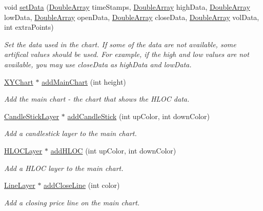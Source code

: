 \begin{DoxyCompactItemize}
void \hyperlink{class_finance_chart_ad3897a3d0352b7380a54c958bf0b67a7}{set\+Data} (\hyperlink{class_double_array}{Double\+Array} time\+Stamps, \hyperlink{class_double_array}{Double\+Array} high\+Data, \hyperlink{class_double_array}{Double\+Array} low\+Data, \hyperlink{class_double_array}{Double\+Array} open\+Data, \hyperlink{class_double_array}{Double\+Array} close\+Data, \hyperlink{class_double_array}{Double\+Array} vol\+Data, int extra\+Points)
\begin{DoxyCompactList}\small\item\em Set the data used in the chart. If some of the data are not available, some artifical values should be used. For example, if the high and low values are not available, you may use close\+Data as high\+Data and low\+Data. \end{DoxyCompactList}\item 
\hyperlink{class_x_y_chart}{X\+Y\+Chart} $\ast$ \hyperlink{class_finance_chart_a69ac5aca5d2d232184398b43fee6eb13}{add\+Main\+Chart} (int height)
\begin{DoxyCompactList}\small\item\em Add the main chart -\/ the chart that shows the H\+L\+OC data. \end{DoxyCompactList}\item 
\hyperlink{class_candle_stick_layer}{Candle\+Stick\+Layer} $\ast$ \hyperlink{class_finance_chart_a84a4d29a87d57f817b52387e8495a986}{add\+Candle\+Stick} (int up\+Color, int down\+Color)
\begin{DoxyCompactList}\small\item\em Add a candlestick layer to the main chart. \end{DoxyCompactList}\item 
\hyperlink{class_h_l_o_c_layer}{H\+L\+O\+C\+Layer} $\ast$ \hyperlink{class_finance_chart_ab54186072d9b48c643dfeeb824968d31}{add\+H\+L\+OC} (int up\+Color, int down\+Color)
\begin{DoxyCompactList}\small\item\em Add a H\+L\+OC layer to the main chart. \end{DoxyCompactList}\item 
\hyperlink{class_line_layer}{Line\+Layer} $\ast$ \hyperlink{class_finance_chart_a2404e8f142be11179a1f41480e14d245}{add\+Close\+Line} (int color)
\begin{DoxyCompactList}\small\item\em Add a closing price line on the main chart. \end{DoxyCompactList}\item 

\end{DoxyCompactItemize}
